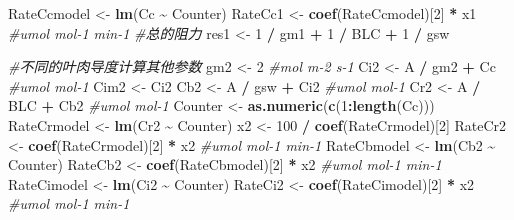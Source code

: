 \documentclass[
]{krantz}
\makeatletter
\newenvironment{Shaded}{\begin{snugshade}}{\end{snugshade}}
\newcommand{\CommentTok}[1]{\textcolor[rgb]{0.56,0.35,0.01}{\textit{#1}}}
\newcommand{\DecValTok}[1]{\textcolor[rgb]{0.00,0.00,0.81}{#1}}
\newcommand{\KeywordTok}[1]{\textcolor[rgb]{0.13,0.29,0.53}{\textbf{#1}}}
\newcommand{\NormalTok}[1]{#1}
\newcommand{\OperatorTok}[1]{\textcolor[rgb]{0.81,0.36,0.00}{\textbf{#1}}}
\newcommand{\StringTok}[1]{\textcolor[rgb]{0.31,0.60,0.02}{#1}}
\newenvironment{kframe}{%
\medskip{}
\setlength{\fboxsep}{.8em}
 \def\at@end@of@kframe{}%
 \ifinner\ifhmode%
  \def\at@end@of@kframe{\end{minipage}}%
  \begin{minipage}{\columnwidth}%
 \fi\fi%
 \def\FrameCommand##1{\hskip\@totalleftmargin \hskip-\fboxsep
 \colorbox{shadecolor}{##1}\hskip-\fboxsep
     \hskip-\linewidth \hskip-\@totalleftmargin \hskip\columnwidth}%
 \MakeFramed {\advance\hsize-\width
   \@totalleftmargin\z@ \linewidth\hsize
   \@setminipage}}%
 {\par\unskip\endMakeFramed%
 \at@end@of@kframe}
\renewenvironment{Shaded}{\begin{kframe}}{\end{kframe}}
\makeatother
\begin{document}
\begin{Shaded}
\begin{Highlighting}[]
\NormalTok{RateCcmodel \textless{}{-}}\StringTok{ }\KeywordTok{lm}\NormalTok{(Cc }\OperatorTok{\textasciitilde{}}\StringTok{ }\NormalTok{Counter)}
\NormalTok{RateCc1 \textless{}{-}}\StringTok{ }\KeywordTok{coef}\NormalTok{(RateCcmodel)[}\DecValTok{2}\NormalTok{] }\OperatorTok{*}\StringTok{ }\NormalTok{x1 }\CommentTok{\#umol mol{-}1 min{-}1}
\CommentTok{\#总的阻力}
\NormalTok{res1 \textless{}{-}}\StringTok{ }\DecValTok{1} \OperatorTok{/}\StringTok{ }\NormalTok{gm1 }\OperatorTok{+}\StringTok{ }\DecValTok{1} \OperatorTok{/}\StringTok{ }\NormalTok{BLC }\OperatorTok{+}\StringTok{ }\DecValTok{1} \OperatorTok{/}\StringTok{ }\NormalTok{gsw}

\CommentTok{\#不同的叶肉导度计算其他参数}
\NormalTok{gm2 \textless{}{-}}\StringTok{ }\DecValTok{2} \CommentTok{\#mol m{-}2 s{-}1}
\NormalTok{Ci2 \textless{}{-}}\StringTok{ }\NormalTok{A }\OperatorTok{/}\StringTok{ }\NormalTok{gm2 }\OperatorTok{+}\StringTok{ }\NormalTok{Cc }\CommentTok{\#umol mol{-}1}
\NormalTok{Cim2 \textless{}{-}}\StringTok{ }\NormalTok{Ci2}
\NormalTok{Cb2 \textless{}{-}}\StringTok{ }\NormalTok{A }\OperatorTok{/}\StringTok{ }\NormalTok{gsw }\OperatorTok{+}\StringTok{ }\NormalTok{Ci2 }\CommentTok{\#umol mol{-}1}
\NormalTok{Cr2 \textless{}{-}}\StringTok{ }\NormalTok{A }\OperatorTok{/}\StringTok{ }\NormalTok{BLC }\OperatorTok{+}\StringTok{ }\NormalTok{Cb2 }\CommentTok{\#umol mol{-}1}
\NormalTok{Counter \textless{}{-}}\StringTok{ }\KeywordTok{as.numeric}\NormalTok{(}\KeywordTok{c}\NormalTok{(}\DecValTok{1}\OperatorTok{:}\KeywordTok{length}\NormalTok{(Cc)))}
\NormalTok{RateCrmodel \textless{}{-}}\StringTok{ }\KeywordTok{lm}\NormalTok{(Cr2 }\OperatorTok{\textasciitilde{}}\StringTok{ }\NormalTok{Counter)}
\NormalTok{x2 \textless{}{-}}\StringTok{ }\DecValTok{100} \OperatorTok{/}\StringTok{ }\KeywordTok{coef}\NormalTok{(RateCrmodel)[}\DecValTok{2}\NormalTok{] }
\NormalTok{RateCr2 \textless{}{-}}\StringTok{ }\KeywordTok{coef}\NormalTok{(RateCrmodel)[}\DecValTok{2}\NormalTok{] }\OperatorTok{*}\StringTok{ }\NormalTok{x2 }\CommentTok{\#umol mol{-}1 min{-}1}
\NormalTok{RateCbmodel \textless{}{-}}\StringTok{ }\KeywordTok{lm}\NormalTok{(Cb2 }\OperatorTok{\textasciitilde{}}\StringTok{ }\NormalTok{Counter)}
\NormalTok{RateCb2 \textless{}{-}}\StringTok{ }\KeywordTok{coef}\NormalTok{(RateCbmodel)[}\DecValTok{2}\NormalTok{] }\OperatorTok{*}\StringTok{ }\NormalTok{x2 }\CommentTok{\#umol mol{-}1 min{-}1}
\NormalTok{RateCimodel \textless{}{-}}\StringTok{ }\KeywordTok{lm}\NormalTok{(Ci2 }\OperatorTok{\textasciitilde{}}\StringTok{ }\NormalTok{Counter)}
\NormalTok{RateCi2 \textless{}{-}}\StringTok{ }\KeywordTok{coef}\NormalTok{(RateCimodel)[}\DecValTok{2}\NormalTok{] }\OperatorTok{*}\StringTok{ }\NormalTok{x2 }\CommentTok{\#umol mol{-}1 min{-}1}

\end{Highlighting}
\end{Shaded}
\end{document}
